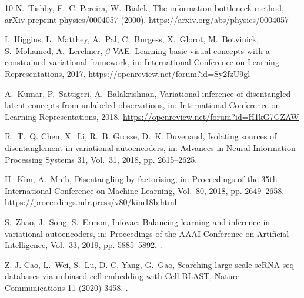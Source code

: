 \documentclass[preprint,12pt]{elsarticle}
\begin{document}
\begin{thebibliography}{10}
N.~Tishby, F.~C. Pereira, W.~Bialek,
  \href{https://arxiv.org/abs/physics/0004057}{The information bottleneck
  method}, arXiv preprint physics/0004057 (2000).
\newline\urlprefix\url{https://arxiv.org/abs/physics/0004057}

I.~Higgins, L.~Matthey, A.~Pal, C.~Burgess, X.~Glorot, M.~Botvinick,
  S.~Mohamed, A.~Lerchner,
  \href{https://openreview.net/forum?id=Sy2fzU9gl}{$\beta$-{VAE}: Learning
  basic visual concepts with a constrained variational framework}, in:
  International Conference on Learning Representations, 2017.
\newline\urlprefix\url{https://openreview.net/forum?id=Sy2fzU9gl}

A.~Kumar, P.~Sattigeri, A.~Balakrishnan,
  \href{https://openreview.net/forum?id=H1kG7GZAW}{Variational inference of
  disentangled latent concepts from unlabeled observations}, in: International
  Conference on Learning Representations, 2018.
\newline\urlprefix\url{https://openreview.net/forum?id=H1kG7GZAW}

R.~T.~Q. Chen, X.~Li, R.~B. Grosse, D.~K. Duvenaud, Isolating sources of
  disentanglement in variational autoencoders, in: Advances in Neural
  Information Processing Systems 31, Vol.~31, 2018, pp. 2615--2625.

H.~Kim, A.~Mnih,
  \href{https://proceedings.mlr.press/v80/kim18b.html}{Disentangling by
  factorising}, in: Proceedings of the 35th International Conference on Machine
  Learning, Vol.~80, 2018, pp. 2649--2658.
\newline\urlprefix\url{https://proceedings.mlr.press/v80/kim18b.html}

S.~Zhao, J.~Song, S.~Ermon, Infovae: Balancing learning and inference in
  variational autoencoders, in: Proceedings of the AAAI Conference on
  Artificial Intelligence, Vol.~33, 2019, pp. 5885--5892.
\newblock \href {https://doi.org/10.1609/aaai.v33i01.33015885}
  {}.

Z.-J. Cao, L.~Wei, S.~Lu, D.-C. Yang, G.~Gao, Searching large-scale {scRNA-seq}
  databases via unbiased cell embedding with {Cell BLAST}, Nature
  Communications 11 (2020) 3458.
\newblock \href {https://doi.org/10.1038/s41467-020-17281-7}
  {}.


\end{thebibliography}
\end{document}

